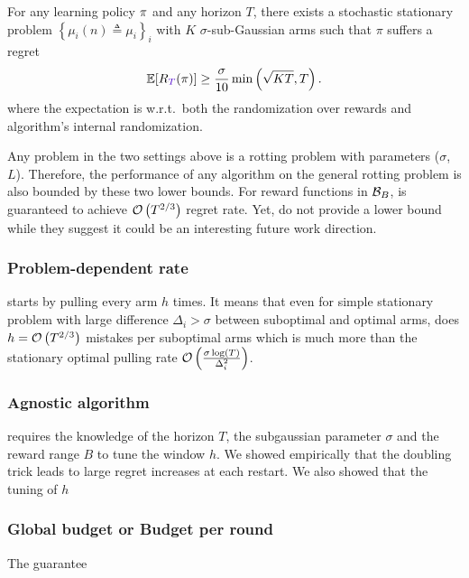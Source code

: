 \begin{proposition}
\label{stochastic-LB}
For any learning policy $\pi$ and any horizon $T$, there exists a stochastic stationary problem $\left\{ \mu_i (n) \triangleq \mu_i\right\}_i$ with $K$ $\sigma$-sub-Gaussian arms such that $\pi$ suffers a regret
\begin{equation*}
 \mathbb{E}[\regret(\policy)] \geq \frac{\sigma}{10}\min\pa{\sqrt{\narms\timeEnd},\timeEnd}.
\end{equation*}
where the expectation is w.r.t.\ both the randomization
over rewards and algorithm's internal randomization.
\end{proposition}

Any problem in the two settings above is a rotting problem with parameters ($\sigma$, $L$). Therefore, the performance of any algorithm on the general rotting problem is also bounded by these two lower bounds. For reward functions in $\mathcal{B}_{B}$, \SWA is guaranteed to achieve $\mathcal{O}\left(T^{2/3}\right)$ regret rate. Yet, \citet{levine2017rotting} do not provide a lower bound while they suggest it could be an interesting future work direction.

\subsubsection{Problem-dependent rate}
\SWA starts by pulling every arm $h$ times. It means that even for simple stationary problem with large difference $\Delta_i > \sigma$ between suboptimal and optimal arms, \SWA does $h = \mathcal{O}\left(T^{2/3}\right)$ mistakes per suboptimal arms which is much more than the stationary optimal pulling rate $\mathcal{O}\left(\frac{\sigma\log\left(T\right)}{\Delta_i^2}\right)$.


\subsubsection{Agnostic algorithm}
\SWA requires the knowledge of the horizon $T$, the subgaussian parameter $\sigma$ and the reward range $B$  to tune the window $h$. We showed empirically that the doubling trick leads to large regret increases at each restart. We also showed that the tuning of $h$


\subsubsection{Global budget or Budget per round}
The guarantee

